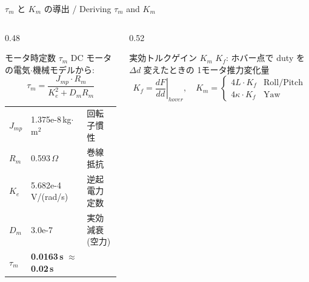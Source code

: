 \begin{frame}{$\tau_m$ と $K_m$ の導出 / Deriving $\tau_m$ and $K_m$}
  \vspace{-2mm}
  \begin{columns}[t]
    \begin{column}{0.48\textwidth}
      \begin{block}{モータ時定数 $\tau_m$}\small
        DC モータの電気$\cdot$機械モデルから:
        \vspace{-0.5em}
        \[
          \tau_m = \frac{J_{mp} \cdot R_m}{K_e^2 + D_m R_m}
        \]
        \vspace{-1.5em}
      \end{block}
      \vspace{-0.2em}
      {\scriptsize
      \begin{tabular}{lll}
        \hline
        $J_{mp}$ & 1.375e-8\,kg$\cdot$m$^2$ & 回転子慣性 \\
        $R_m$    & 0.593\,$\Omega$    & 巻線抵抗 \\
        $K_e$    & 5.682e-4\,V/(rad/s) & 逆起電力定数 \\
        $D_m$    & 3.0e-7 & 実効減衰(空力) \\
        \hline
        $\tau_m$ & \textbf{0.0163\,s} $\approx$ \textbf{0.02\,s} & \\
        \hline
      \end{tabular}}
    \end{column}
    \begin{column}{0.52\textwidth}
      \begin{block}{実効トルクゲイン $K_m$}\small
        $K_f$: ホバー点で duty を $\Delta d$ 変えたときの
        1モータ推力変化量\vspace{-0.3em}
        \[
          K_f = \left.\frac{dF}{dd}\right|_{\!hover}\!,\quad
          K_m = \begin{cases}
            4L \cdot K_f & \text{Roll/Pitch}\\
            4\kappa \cdot K_f & \text{Yaw}
          \end{cases}
        \]
        \vspace{-1.5em}
      \end{block}

\end{column}
\end{columns}
\end{frame}
